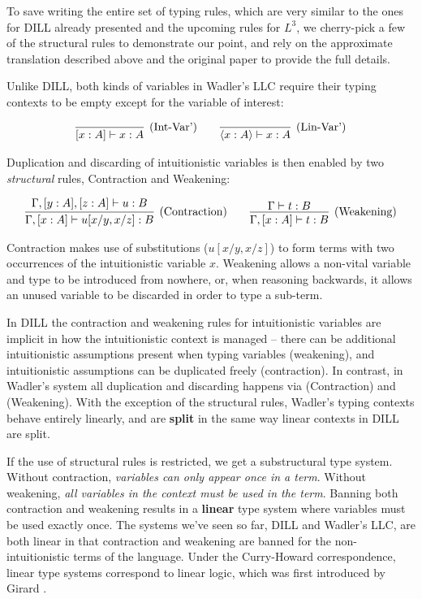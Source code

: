 \documentclass[]{unswthesis}
\newcommand{\types}{\vdash}
\let\i\textit
\let\b\textbf
\let\t\text
\begin{document}
To save writing the entire set of typing rules, which are very similar to the ones for DILL already presented and the upcoming rules for $L^3$, we cherry-pick a few of the structural rules to demonstrate our point, and rely on the approximate translation described above and the original paper \cite{wadler93} to provide the full details.

Unlike DILL, both kinds of variables in Wadler's LLC require their typing contexts to be empty except for the variable of interest:

\begin{eqnarray*}
\infer[\t{(Int-Var')}]{[x : A] \types x : A}{} \qquad
\infer[\t{(Lin-Var')}]{\langle x : A \rangle \types x : A}{}
\end{eqnarray*}

Duplication and discarding of intuitionistic variables is then enabled by two \i{structural} rules, Contraction and Weakening:

\begin{eqnarray*}
\infer[\t{(Contraction)}]{\Gamma, [x : A] \types u[x/y, x/z] : B}{
  \Gamma, [y : A], [z : A] \types u : B
}
\qquad
\infer[\text{(Weakening)}]{\Gamma, [x : A] \types t : B}{
  \Gamma \types t : B
}
\end{eqnarray*}

Contraction makes use of substitutions ($u[x/y, x/z]$) to form terms with two occurrences of the intuitionistic variable $x$. Weakening allows a non-vital variable and type to be introduced from nowhere, or, when reasoning backwards, it allows an unused variable to be discarded in order to type a sub-term.

In DILL the contraction and weakening rules for intuitionistic variables are implicit in how the intuitionistic context is managed -- there can be additional intuitionistic assumptions present when typing variables (weakening), and intuitionistic assumptions can be duplicated freely (contraction). In contrast, in Wadler's system all duplication and discarding happens via (Contraction) and (Weakening). With the exception of the structural rules, Wadler's typing contexts behave entirely linearly, and are \b{split} in the same way linear contexts in DILL are split.

If the use of structural rules is restricted, we get a substructural type system. Without contraction, \i{variables can only appear once in a term}. Without weakening, \i{all variables in the context must be used in the term}. Banning both contraction and weakening results in a \b{linear} type system where variables must be used exactly once. The systems we've seen so far, DILL and Wadler's LLC, are both linear in that contraction and weakening are banned for the non-intuitionistic terms of the language. Under the Curry-Howard correspondence, linear type systems correspond to linear logic, which was first introduced by Girard \cite{girard87}.
\end{document}
